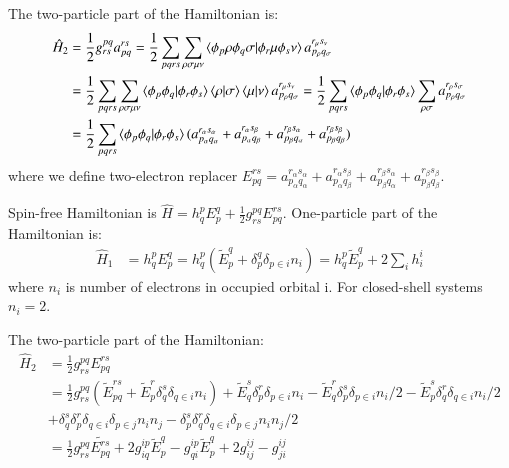 \documentclass[journal=jacsat]{achemso}
\numberwithin{equation}{section}
\begin{document}
The two-particle part of the Hamiltonian is:
\begin{align}
\hat{H}_{2}&=\frac{1}{2}g^{pq}_{rs}a^{rs}_{pq}=\frac{1}{2}\sum_{pqrs}\sum_{\rho\sigma\mu\nu}\braket{\phi_{p}\rho\phi_{q}\sigma|\phi_{r}\mu\phi_{s}\nu}a^{r_{\mu}s_{\nu}}_{p_{\rho}q_{\sigma}}\\
&=\frac{1}{2}\sum_{pqrs}\sum_{\rho\sigma\mu\nu}\braket{\phi_{p}\phi_{q}|\phi_{r}\phi_{s}}\braket{\rho|\sigma}\braket{\mu|\nu}a^{r_{\mu}s_{\nu}}_{p_{\rho}q_{\sigma}}=\frac{1}{2}\sum_{pqrs}\braket{\phi_{p}\phi_{q}|\phi_{r}\phi_{s}}\sum_{\rho\sigma}a^{r_{\rho}s_{\sigma}}_{p_{\rho}q_{\sigma}}\\
&=\frac{1}{2}\sum_{pqrs}\braket{\phi_{p}\phi_{q}|\phi_{r}\phi_{s}}(a^{r_{\alpha}s_{\alpha}}_{p_{\alpha}q_{\alpha}}+a^{r_{\alpha}s_{\beta}}_{p_{\alpha}q_{\beta}}+a^{r_{\beta}s_{\alpha}}_{p_{\beta}q_{\alpha}}+a^{r_{\beta}s_{\beta}}_{p_{\beta}q_{\beta}})
\end{align}
where we define two-electron replacer $E^{rs}_{pq}=a^{r_{\alpha}s_{\alpha}}_{p_{\alpha}q_{\alpha}}+a^{r_{\alpha}s_{\beta}}_{p_{\alpha}q_{\beta}}+a^{r_{\beta}s_{\alpha}}_{p_{\beta}q_{\alpha}}+a^{r_{\beta}s_{\beta}}_{p_{\beta}q_{\beta}}$. 

Spin-free Hamiltonian is $\hat{H}=h^{p}_{q}E^{q}_{p}+\frac{1}{2}g^{pq}_{rs}E^{rs}_{pq}$. One-particle part of the Hamiltonian is:
\begin{align}
\hat{H}_{1}&=h^{p}_{q}E^{q}_{p}=h^{p}_{q}(\tilde{E}^{q}_{p}+\delta^{q}_{p}\delta_{p \in i}n_{i})=h^{p}_{q}\tilde{E}^{q}_{p}+2\sum_{i}h^{i}_{i}
\end{align}
where $n_{i}$ is number of electrons in occupied orbital i. For closed-shell systems $n_{i}=2$.

The two-particle part of the Hamiltonian:
\begin{align}
\hat{H}_{2}&=\frac{1}{2}g^{pq}_{rs}E^{rs}_{pq}\\\nonumber
&=\frac{1}{2}g^{pq}_{rs}(\tilde{E}^{rs}_{pq}+\tilde{E}^{r}_{p}\delta^{s}_{q}\delta_{q \in i}n_{i})+\tilde{E}^{s}_{q}\delta^{r}_{p}\delta_{p \in i}n_{i}-\tilde{E}^{r}_{q}\delta^{s}_{p}\delta_{p \in i}n_{i}/2-\tilde{E}^{s}_{p}\delta^{r}_{q}\delta_{q \in i}n_{i}/2\\\nonumber
&+\delta^{s}_{q}\delta^{r}_{p}\delta_{q \in i}\delta_{p \in j}n_{i}n_{j}-\delta^{s}_{p}\delta^{r}_{q}\delta_{q \in i}\delta_{p \in j}n_{i}n_{j}/2\\\nonumber
&=\frac{1}{2}g^{pq}_{rs}\tilde{E^{rs}_{pq}}+2g^{ip}_{iq}\tilde{E}^{q}_{p}-g^{ip}_{qi}\tilde{E}^{q}_{p}+2g^{ij}_{ij}-g^{ij}_{ji}
\end{align}
\end{document}
